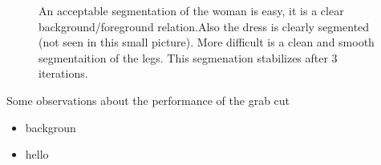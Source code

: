 \documentclass[11pt,a4paper]{article}
\begin{document}
\begin{figure}
\centering
{}
\quad
{}

\caption{An acceptable segmentation of the woman is easy, it is a clear background/foreground relation.Also the dress is clearly segmented (not seen in this small picture). More difficult is a clean and smooth segmentaition of the legs. This segmenation stabilizes after 3 iterations.}%

\end{figure}
Some observations about the performance of the grab cut
\begin{itemize}
\item backgroun
\item hello
\end{itemize}
\end{document}
